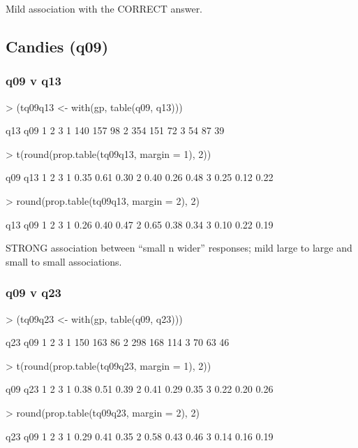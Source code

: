 \documentclass[11pt]{article}
\begin{document}
Mild association with the CORRECT answer.

\subsection{Candies (q09)}
\label{sec-1-3}
\subsubsection{q09 v q13}
\label{sec-1-3-1}
\begin{Schunk}
\begin{Sinput}
> (tq09q13 <- with(gp, table(q09, q13)))
\end{Sinput}
\begin{Soutput}
   q13
q09   1   2   3
  1 140 157  98
  2 354 151  72
  3  54  87  39
\end{Soutput}
\begin{Sinput}
> t(round(prop.table(tq09q13, margin = 1), 2))
\end{Sinput}
\begin{Soutput}
   q09
q13    1    2    3
  1 0.35 0.61 0.30
  2 0.40 0.26 0.48
  3 0.25 0.12 0.22
\end{Soutput}
\begin{Sinput}
> round(prop.table(tq09q13, margin = 2), 2)
\end{Sinput}
\begin{Soutput}
   q13
q09    1    2    3
  1 0.26 0.40 0.47
  2 0.65 0.38 0.34
  3 0.10 0.22 0.19
\end{Soutput}
\end{Schunk}


STRONG association between ``small n wider'' responses; mild large to large and small to small associations.

\subsubsection{q09 v q23}
\label{sec-1-3-2}
\begin{Schunk}
\begin{Sinput}
> (tq09q23 <- with(gp, table(q09, q23)))
\end{Sinput}
\begin{Soutput}
   q23
q09   1   2   3
  1 150 163  86
  2 298 168 114
  3  70  63  46
\end{Soutput}
\begin{Sinput}
> t(round(prop.table(tq09q23, margin = 1), 2))
\end{Sinput}
\begin{Soutput}
   q09
q23    1    2    3
  1 0.38 0.51 0.39
  2 0.41 0.29 0.35
  3 0.22 0.20 0.26
\end{Soutput}
\begin{Sinput}
> round(prop.table(tq09q23, margin = 2), 2)
\end{Sinput}
\begin{Soutput}
   q23
q09    1    2    3
  1 0.29 0.41 0.35
  2 0.58 0.43 0.46
  3 0.14 0.16 0.19
\end{Soutput}
\end{Schunk}
\end{document}
